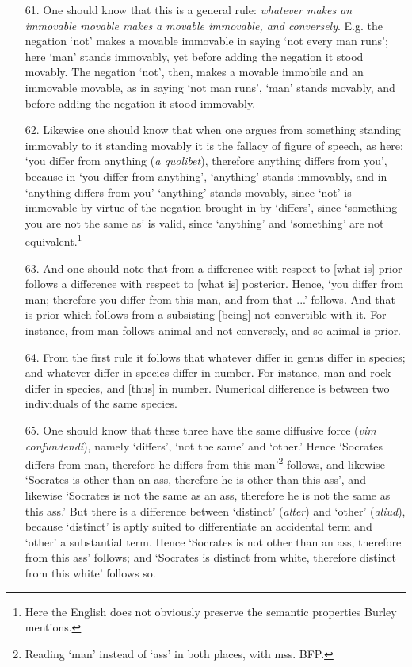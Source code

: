 \documentclass[]{article}
\begin{document}
\begin{itemize}
\item[61.] One should know that this is a general rule: \textit{whatever makes an immovable movable makes a movable immovable, and conversely}. E.g. the negation `not' makes a movable immovable in saying `not every man runs'; here `man' stands immovably, yet before adding the negation it stood movably. The negation `not', then, makes a movable immobile and an immovable movable, as in saying `not man runs', `man' stands movably, and before adding the negation it stood immovably. 
\item[62.] Likewise one should know that when one argues from something standing immovably to it standing movably it is the fallacy of figure of speech, as here: `you differ from anything (\textit{a quolibet}), therefore anything differs from you', because in `you differ from anything', `anything' stands immovably, and in `anything differs from you' `anything' stands movably, since `not' is immovable by virtue of the negation brought in by `differs', since `something you are not the same as' is valid, since `anything' and `something' are not equivalent.\footnote{Here the English does not obviously preserve the semantic properties Burley mentions.}
\item[63.] And one should note that from a difference with respect to [what is] prior follows a difference with respect to [what is] posterior. Hence, `you differ from man; therefore you differ from this man, and from that ...' follows. And that is prior which follows from a subsisting [being] not convertible with it. For instance, from man follows animal and not conversely, and so animal is prior.
\item[64.] From the first rule it follows that whatever differ in genus differ in species; and whatever differ in species differ in number. For instance, man and rock differ in species, and [thus] in number. Numerical difference is between two individuals of the same species.
\item[65.] One should know that these three have the same diffusive force (\textit{vim confundendi}), namely `differs', `not the same' and `other.' Hence `Socrates differs from man, therefore he differs from this man'\footnote{Reading `man' instead of `ass' in both places, with mss. BFP.} follows, and likewise `Socrates is other than an ass, therefore he is other than this ass', and likewise `Socrates is not the same as an ass, therefore he is not the same as this ass.' But there is a difference between `distinct' (\textit{alter}) and `other' (\textit{aliud}), because `distinct' is aptly suited to differentiate an accidental term and `other' a substantial term. Hence `Socrates is not other than an ass, therefore from this ass' follows; and `Socrates is distinct from white, therefore distinct from this white' follows so.
\end{itemize}
\end{document}
